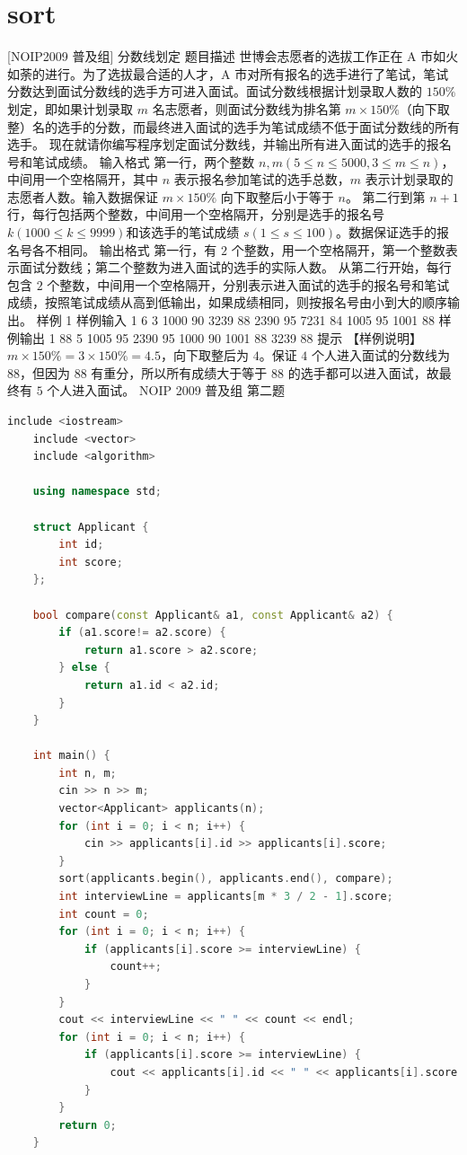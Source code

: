 \documentclass[12pt,twiside,a4paper]{ctexbook}
\numberwithin{chapter}{part}
\begin{document}
\section{sort}
 [NOIP2009 普及组] 分数线划定
 题目描述
世博会志愿者的选拔工作正在 A 市如火如荼的进行。为了选拔最合适的人才，A 市对所有报名的选手进行了笔试，笔试分数达到面试分数线的选手方可进入面试。面试分数线根据计划录取人数的 $150\%$ 划定，即如果计划录取 $m$ 名志愿者，则面试分数线为排名第 $m \times 150\%$（向下取整）名的选手的分数，而最终进入面试的选手为笔试成绩不低于面试分数线的所有选手。
现在就请你编写程序划定面试分数线，并输出所有进入面试的选手的报名号和笔试成绩。
 输入格式
第一行，两个整数 $n,m(5 \leq n \leq 5000,3 \leq m \leq n)$，中间用一个空格隔开，其中 $n$ 表示报名参加笔试的选手总数，$m$ 表示计划录取的志愿者人数。输入数据保证 $m \times 150\%$ 向下取整后小于等于 $n$。
第二行到第 $n+1$ 行，每行包括两个整数，中间用一个空格隔开，分别是选手的报名号 $k(1000 \leq k \leq 9999)$和该选手的笔试成绩 $s(1 \leq s \leq 100)$。数据保证选手的报名号各不相同。
 输出格式
第一行，有 $2$ 个整数，用一个空格隔开，第一个整数表示面试分数线；第二个整数为进入面试的选手的实际人数。
从第二行开始，每行包含 $2$ 个整数，中间用一个空格隔开，分别表示进入面试的选手的报名号和笔试成绩，按照笔试成绩从高到低输出，如果成绩相同，则按报名号由小到大的顺序输出。
 样例 1
 样例输入 1
6 3 
1000 90 
3239 88 
2390 95 
7231 84 
1005 95 
1001 88
 样例输出 1
88 5 
1005 95 
2390 95 
1000 90 
1001 88 
3239 88
 提示
【样例说明】
$m \times 150\% = 3 \times150\% = 4.5$，向下取整后为 $4$。保证 $4$ 个人进入面试的分数线为 $88$，但因为 $88$ 有重分，所以所有成绩大于等于 $88$ 的选手都可以进入面试，故最终有 $5$ 个人进入面试。
NOIP 2009 普及组 第二题
\begin{lstlisting}[language=c++,breaklines=true]
    include <iostream>
    include <vector>
    include <algorithm>
    
    using namespace std;
    
    struct Applicant {
        int id;
        int score;
    };
    
    bool compare(const Applicant& a1, const Applicant& a2) {
        if (a1.score!= a2.score) {
            return a1.score > a2.score;
        } else {
            return a1.id < a2.id;
        }
    }
    
    int main() {
        int n, m;
        cin >> n >> m;
        vector<Applicant> applicants(n);
        for (int i = 0; i < n; i++) {
            cin >> applicants[i].id >> applicants[i].score;
        }
        sort(applicants.begin(), applicants.end(), compare);
        int interviewLine = applicants[m * 3 / 2 - 1].score;
        int count = 0;
        for (int i = 0; i < n; i++) {
            if (applicants[i].score >= interviewLine) {
                count++;
            }
        }
        cout << interviewLine << " " << count << endl;
        for (int i = 0; i < n; i++) {
            if (applicants[i].score >= interviewLine) {
                cout << applicants[i].id << " " << applicants[i].score << endl;
            }
        }
        return 0;
    }
\end{lstlisting}
\end{document}
